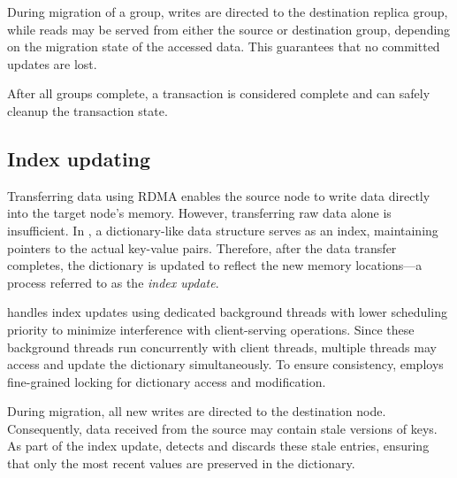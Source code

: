 During migration of a group, writes are directed to the destination replica group, while reads may be served from either the source or destination group, depending on the migration state of the accessed data.
This guarantees that no committed updates are lost. 



After all groups complete, a transaction is considered complete and can safely cleanup the transaction state. 









\subsection{Index updating}
\label{sec:index_updating}


Transferring data using RDMA enables the source node to write data directly into the target node’s memory.
However, transferring raw data alone is insufficient. 
In \OurImplementation{}, a dictionary-like data structure serves as an index, maintaining pointers to the actual key-value pairs. 
Therefore, after the data transfer completes, the dictionary is updated to reflect the new memory locations—a process referred to as the \emph{index update}.

\OurImplementation{} handles index updates using dedicated background threads with lower scheduling priority to minimize interference with client-serving operations. 
Since these background threads run concurrently with client threads, multiple threads may access and update the dictionary simultaneously.
To ensure consistency, \OurImplementation{} employs fine-grained locking for dictionary access and modification.

During migration, all new writes are directed to the destination node. Consequently, data received from the source may contain stale versions of keys. As part of the index update, \OurImplementation{} detects and discards these stale entries, 
ensuring that only the most recent values are preserved in the dictionary.



































